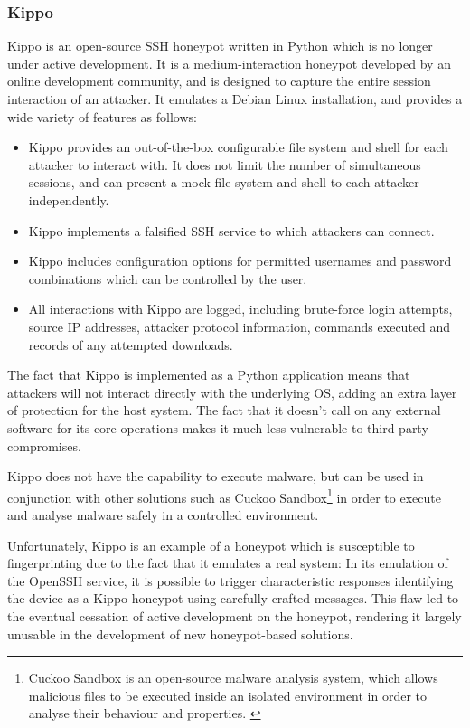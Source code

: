 \subsubsection{Kippo} \label{AboutKippo}
	
	Kippo is an open-source SSH honeypot written in Python which is no longer under active development. It is a medium-interaction honeypot developed by an online development community, and is designed to capture the entire session interaction of an attacker. \cite{KippoHoneypotGithub} It emulates a Debian Linux installation, and provides a wide variety of features as follows:
    
    \begin{itemize}
    \item Kippo provides an out-of-the-box configurable file system and shell for each attacker to interact with. It does not limit the number of simultaneous sessions, and can present a mock file system and shell to each attacker independently.
    \item Kippo implements a falsified SSH service to which attackers can connect.
    \item Kippo includes configuration options for permitted usernames and password combinations which can be controlled by the user.
    \item All interactions with Kippo are logged, including brute-force login attempts, source IP addresses, attacker protocol information, commands executed and records of any attempted downloads.
    \end{itemize}	
	 The fact that Kippo is implemented as a Python application means that attackers will not interact directly with the underlying OS, adding an extra layer of protection for the host system. The fact that it doesn't call on any external software for its core operations makes it much less vulnerable to third-party compromises. 

	Kippo does not have the capability to execute malware, but can be used in conjunction with other solutions such as Cuckoo Sandbox\footnote{Cuckoo Sandbox is an open-source malware analysis system, which allows malicious files to be executed inside an isolated environment in order to analyse their behaviour and properties. \cite{CuckooSandbox}} in order to execute and analyse malware safely in a controlled environment.

Unfortunately, Kippo is an example of a honeypot which is susceptible to fingerprinting due to the fact that it emulates a real system: In its emulation of the OpenSSH service, it is possible to trigger characteristic responses identifying the device as a Kippo honeypot using carefully crafted messages. \cite{Nawrocki2016} This flaw led to the eventual cessation of active development on the honeypot, rendering it largely unusable in the development of new honeypot-based solutions.
	
